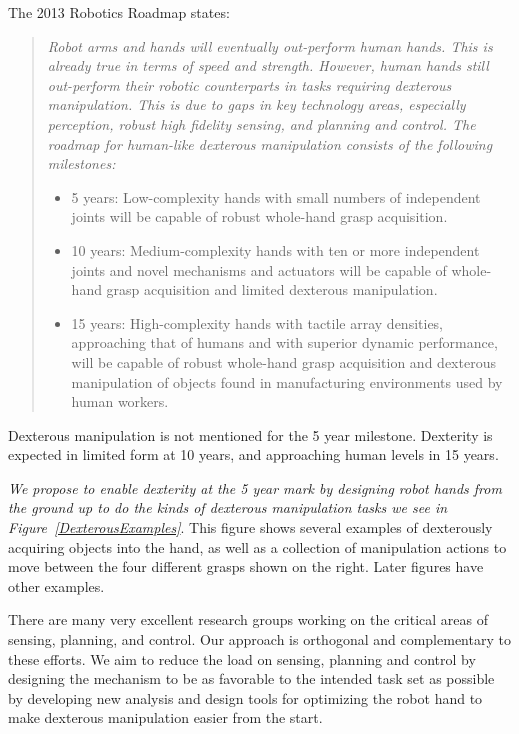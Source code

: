 The 2013 Robotics Roadmap \cite{christensen2009roadmap} states:
\begin{quotation}
{\small \it
Robot arms and hands will eventually out-perform human hands. This is already true in terms of speed and strength. However, human hands still out-perform their robotic counterparts in tasks requiring dexterous manipulation. This is due to gaps in key technology areas, especially perception, robust high fidelity sensing, and planning and control. The roadmap for human-like dexterous manipulation consists of the following milestones:
\begin{itemize}
	\item 5 years: Low-complexity hands with small numbers of independent joints will be capable of robust whole-hand grasp acquisition.
	\item 10 years: Medium-complexity hands with ten or more independent joints and novel mechanisms and actuators will be capable of whole-hand grasp acquisition and limited dexterous manipulation.
	\item 15 years: High-complexity hands with tactile array densities, approaching that of humans and with superior dynamic performance, will be capable of robust whole-hand grasp acquisition and dexterous manipulation of objects found in manufacturing environments used by human workers.
\end{itemize}}
\end{quotation}
Dexterous manipulation is not mentioned for the 5 year milestone.   Dexterity is expected in limited form at 10 years, and approaching human levels in 15 years.

{\it We propose to enable dexterity at the 5 year mark by designing robot hands from the ground up to do the kinds of dexterous manipulation tasks we see in Figure~\ref{DexterousExamples}}.   This figure shows several examples of dexterously acquiring objects into the hand, as well as a collection of manipulation actions to move between the four different grasps shown on the right.  Later figures have other examples.

There are many very excellent research groups working on the critical areas of sensing, planning, and control.   Our approach is orthogonal and complementary to these efforts.    We aim to reduce the load on sensing, planning and control by designing the mechanism to be as favorable to the intended task set as possible by developing new analysis and design tools for optimizing the robot hand to make dexterous manipulation easier from the start.

